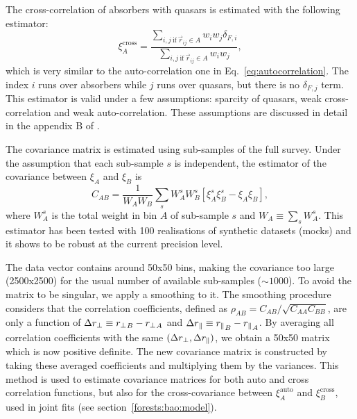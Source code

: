 The cross-correlation of absorbers with quasars is estimated with the following estimator: 
\begin{equation}
    \xi^\mathrm{cross}_A = \frac{\sum_{i, j ~ \mathrm{if} ~ \vec{r}_{ij} \in A} w_i w_j \delta_{F, i}}{\sum_{i, j ~ \mathrm{if} ~ \vec{r}_{ij} \in A} w_i w_j},
    \label{eq:crosscorrelation} 
\end{equation}
which is very similar to the auto-correlation one in Eq.~\ref{eq:autocorrelation}.
The index $i$ runs over absorbers while $j$ runs over quasars, but there is no $\delta_{F,j}$ term. 
This estimator is valid under a few assumptions: sparcity of quasars, weak cross-correlation 
and weak auto-correlation. These assumptions are discussed in detail in the appendix B of
\cite{font-riberaLargescaleCrosscorrelationDamped2012}. 

The covariance matrix is estimated using sub-samples of the full survey. Under the 
assumption that each sub-sample $s$ is independent, the estimator of the covariance
between $\xi_A$ and $\xi_B$ is
\begin{equation}
C_{AB} = \frac{1}{W_A W_B} \sum_{s} W_A^s W_B^s [ \xi^s_A \xi^s_B - \xi_A \xi_B],
\label{eq:covariance-subsampling}
\end{equation}
where $W_A^s$ is the total weight in bin $A$ of sub-sample $s$ and $W_A \equiv \sum_s W_A^s$. 
This estimator has been tested with 100 realisations of synthetic datasets (mocks) and 
it shows to be robust at the current precision level. 

The data vector contains around 50x50 bins, making the covariance too large (2500x2500)
for the usual number of available sub-samples ($\sim 1000$). To avoid the matrix to be 
singular, we apply a smoothing to it. The smoothing procedure considers that the 
correlation coefficients, defined as $\rho_{AB} = C_{AB}/\sqrt{C_{AA} C_{BB}}$, 
are only a function of $\Delta {r_\perp} \equiv {r_\perp}_B - {r_\perp}_A$ and 
$\Delta {r_\parallel} \equiv {r_\parallel}_B - {r_\parallel}_A$. By averaging all correlation coefficients
with the same $(\Delta {r_\perp}, \Delta {r_\parallel})$, we obtain a 50x50 matrix which is now 
positive definite. The new covariance matrix is constructed by taking these averaged 
coefficients and multiplying them by the variances. This method is used to estimate 
covariance matrices for both auto and cross correlation functions, but also for the 
cross-covariance between $\xi^\mathrm{auto}_A$ and $\xi^\mathrm{cross}_B$, used in 
joint fits (see section~\ref{forests:bao:model}).



